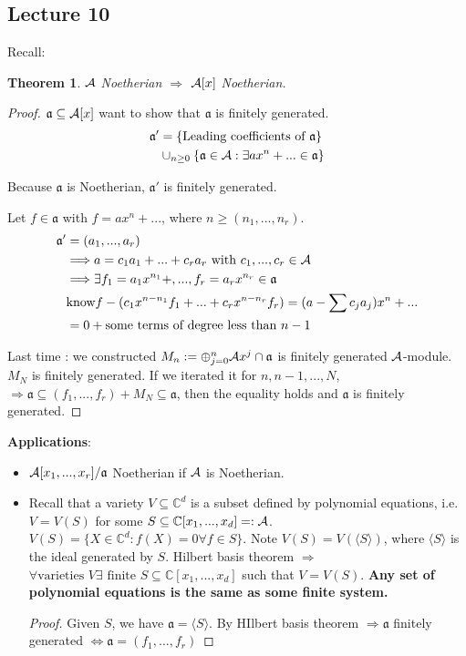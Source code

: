 \documentclass[11pt]{article}
\newtheorem{thm}{Theorem}[section]
\newcommand{\cplx}{\mathbb C}
\newcommand{\sca}{{\mathfrak a}}
\newcommand{\cala}{{\cal A}}
\newcommand{\Lrta}{\Longrightarrow}
\newcommand{\Llrta}{\Longleftrightarrow}
\newcommand{\lgl}{\langle}
\newcommand{\rgl}{\rangle}
\begin{document}
\subsection{Lecture 10}
Recall:
\begin{thm}
$\cala$ Noetherian $\Lrta $ $\cala[x]$ Noetherian.
\end{thm}
\begin{proof}
$\sca\subseteq \cala[x]$ want to show that $\sca$ is finitely generated. 
$$
\begin{aligned}
\sca' &=\{\text{Leading coefficients of $\sca$}\}\\
& \cup_{n\geq 0}\{\sca\in\cala: \exists a x^n+...\in \sca\}
\end{aligned}
$$


Because $\sca $ is Noetherian, $\sca'$ is finitely generated.

Let $f\in \sca$ with $f=ax^n+...$, where $n\geq (n_1,...,n_r)$.
$$
\begin{aligned}
\sca' &=(a_1,...,a_r)\\
&\Lrta a=c_1 a_1+...+c_r a_r\text{ with } c_1,...,c_r\in \cala\\
&\Lrta \exists f_1=a_1 x^{n_1}+,..., f_r=a_r x^{n_r}\in\sca\\
&\text{know} f-(c_1 x^{n-n_1}f_1+...+c_r x^{n-n_r}f_r)=(a-\sum c_j a_j)x^n+...\\
&=0+ \text{some terms of degree less than $n-1$}
\end{aligned}
$$

Last time : we constructed $M_n:=\oplus^n_{j=0}\cala x^j\cap \sca$ is finitely generated $\cala$-module. $M_N$ is finitely generated. If we iterated it for $n,n-1,...,N$, $\Lrta\sca\subseteq (f_1,...,f_r)+M_N\subseteq \sca$, then the equality holds and $\sca$ is finitely generated.
\end{proof}

\textbf{Applications}:
\begin{itemize}
    \item 
    $\cala[x_1,...,x_r]/\sca$ Noetherian if $\cala $ is Noetherian. 
    \item 
    Recall that  a variety $V\subseteq \cplx^d$ is a subset defined by polynomial equations, i.e.
    $V=V(S)$ for some $S\subseteq \cplx[x_1,...,x_d]=:\cala$. $V(S)=\{X\in \cplx^d:f(X)=0\forall f\in S\}$.
    Note $V(S)=V(\lgl S\rgl)$, where $\lgl S\rgl$ is the ideal generated by $S$. Hilbert basis theorem $\Lrta$ $\forall \text{varieties } V\exists \text{ finite } S\subseteq \cplx[x_1,...,x_d]$ such that $V=V(S)$. \textbf{Any set of polynomial equations is the same as some finite system.}
    \begin{proof}
    Given $S$, we have $\sca=\lgl S\rgl$. By HIlbert basis theorem $\Lrta\sca$ finitely generated $\Llrta\sca=(f_1,...,f_r)$
    \end{proof}
\end{itemize}
\end{document}

